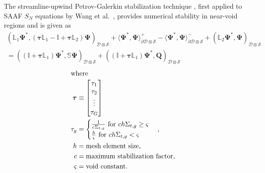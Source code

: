 The streamline-upwind Petrov-Galerkin stabilization technique \cite{brooks_streamline_1982}, first
applied to \gls{SAAF} $S_N$ equations by Wang et al.\ \cite{wangDiffusionAccelerationSchemes2014}, provides
numerical stability in near-void regions and is given as
%
\begin{multline}
  \left(\mathbb{L}_1\bm{\Psi}^*,
  \left(\bm{\tau}\mathbb{L}_1-\mathbb{I}+\bm{\tau}\mathbb{L}_2\right)\bm{\Psi}\right)_{\mathcal{D}\otimes\mathcal{S}} +
  \langle\bm{\Psi}^*,\bm{\Psi}\rangle_{\partial\mathcal{D}\otimes\mathcal{S}}^+ -
  \langle\bm{\Psi}^*,\bm{\Psi}\rangle_{\partial\mathcal{D}\otimes\mathcal{S}}^- +
  \left(\mathbb{L}_2\bm{\Psi}^*,\bm{\Psi}\right)_{\mathcal{D}\otimes\mathcal{S}} \\
  = \left(\left(\mathbb{I}+\bm{\tau}\mathbb{L}_1\right)\bm{\Psi}^*,\mathbb{S}\bm{\Psi}\right)_{\mathcal{D}\otimes\mathcal{S}} +
  \left(\left(\mathbb{I}+\bm{\tau}\mathbb{L}_1\right)\bm{\Psi}^*,\bm{Q}\right)_{\mathcal{D}\otimes\mathcal{S}}
  \label{eq:saaf-vt}
\end{multline}
%
\begin{gather}
  \shortintertext{where}
  \begin{align*}
    \bm{\tau} &\equiv
    \begin{bmatrix}
      \tau_1 \\
      \tau_2 \\
      \vdots \\
      \tau_G
    \end{bmatrix} \\
    \tau_g &=
    \begin{cases}
      \frac{1}{c\Sigma_{t,g}} \mbox{ for } ch\Sigma_{t,g} \geq \varsigma \\
      \frac{h}{\varsigma} \mbox{ for } ch\Sigma_{t,g} < \varsigma
    \end{cases}, & \\
    h &= \mbox{mesh element size,} & \\
    c &= \mbox{maximum stabilization factor,} & \\
    \varsigma &= \mbox{void constant.} &
  \end{align*}
\end{gather}

